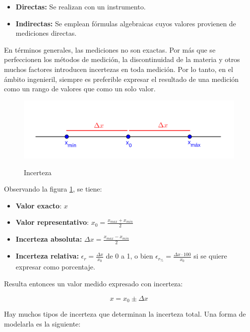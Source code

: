 \documentclass{article}
\begin{document}
\begin{itemize}
\item \textbf{Directas:} Se realizan con un instrumento.
\item \textbf{Indirectas:} Se emplean fórmulas algebraicas cuyos valores provienen de mediciones directas.
\end{itemize}

En términos generales, las mediciones no son exactas. Por más que se perfeccionen los métodos de medición, la discontinuidad de la materia y otros muchos factores introducen incertezas en toda medición. Por lo tanto, en el ámbito ingenieril, siempre es preferible expresar el resultado de una medición como un rango de valores que como un solo valor.

\begin{figure}[ht]
\caption{Incerteza}
\includegraphics[scale=2]{../../common/img/62.01/practice/001-uncertainty.png} 
\centering
\label{fig:incerteza}
\end{figure}

Observando la figura \ref{fig:incerteza}, se tiene:

\begin{itemize}
\item \textbf{Valor exacto}: $x$
\item \textbf{Valor representativo}: $x_0 = \frac{x_{max} + x_{min}}{2}$
\item \textbf{Incerteza absoluta:} $\Delta x = \frac{x_{max} - x_{min}}{2}$
\item \textbf{Incerteza relativa:} $\epsilon_r = \frac{\Delta x}{x_0}$ de 0 a 1, o bien $\epsilon_{r_{\%}} = \frac{\Delta x \cdot 100}{x_0}$ si se quiere expresar como porcentaje.
\end{itemize}

Resulta entonces un valor medido expresado con incerteza:

\begin{equation}
x = x_0 \pm \Delta x
\end{equation}

Hay muchos tipos de incerteza que determinan la incerteza total. Una forma de modelarla es la siguiente:
\end{document}
